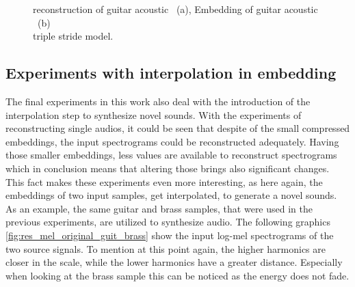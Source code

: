 \begin{figure}[htb!]
    \centering
    \captionsetup{justification=centering}
    \caption{reconstruction of guitar acoustic ~(a), Embedding of guitar acoustic ~(b)\\triple stride model.}
    \label{fig:res_mel_triple_str_2D_output_emb}
\end{figure}

\subsection{Experiments with interpolation in embedding}
The final experiments in this work also deal with the introduction of the interpolation step to synthesize novel sounds. With the experiments of reconstructing single audios, it could be seen that despite of the small compressed embeddings, the input spectrograms could be reconstructed adequately. Having those smaller embeddings, less values are available to reconstruct spectrograms which in conclusion means that altering those brings also significant changes. This fact makes these experiments even more interesting, as here again, the embeddings of two input samples, get interpolated, to generate a novel sounds. As an example, the same guitar and brass samples, that were used in the previous experiments, are utilized to synthesize audio. The following graphics \ref{fig:res_mel_original_guit_brass} show the input log-mel spectrograms of the two source signals. To mention at this point again, the higher harmonics are closer in the scale, while the lower harmonics have a greater distance. Especially when looking at the brass sample this can be noticed as the energy does not fade.

